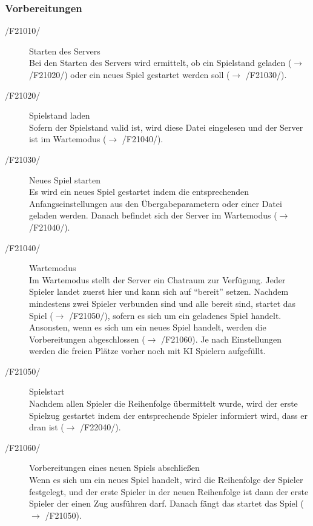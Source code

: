 \documentclass[a4paper,10pt]{article}
\begin{document}
\subsubsection{Vorbereitungen}
\begin{description}
\item[/F21010/] Starten des Servers \\
Bei den Starten des Servers wird ermittelt, ob ein Spielstand geladen ($\rightarrow$ /F21020/) oder ein neues Spiel gestartet werden soll ($\rightarrow$ /F21030/).
\item[/F21020/] Spielstand laden \\
Sofern der Spielstand valid ist, wird diese Datei eingelesen und der Server ist im Wartemodus ($\rightarrow$ /F21040/).
\item[/F21030/] Neues Spiel starten \\
Es wird ein neues Spiel gestartet indem die entsprechenden Anfangseinstellungen aus den Übergabeparametern oder einer Datei geladen werden. Danach befindet sich der Server im Wartemodus ($\rightarrow$ /F21040/).
\item[/F21040/] Wartemodus \\
Im Wartemodus stellt der Server ein Chatraum zur Verfügung. Jeder Spieler landet zuerst hier und kann sich auf "`bereit"' setzen. Nachdem mindestens zwei Spieler verbunden sind und alle bereit sind, startet das Spiel ($\rightarrow$ /F21050/), sofern es sich um ein geladenes Spiel handelt. Ansonsten, wenn es sich um ein neues Spiel handelt, werden die Vorbereitungen abgeschlossen ($\rightarrow$ /F21060). Je nach Einstellungen werden die freien Plätze vorher noch mit KI Spielern aufgefüllt.
\item[/F21050/] Spielstart \\
Nachdem allen Spieler die Reihenfolge übermittelt wurde, wird der erste Spielzug gestartet indem der entsprechende Spieler informiert wird, dass er dran ist ($\rightarrow$ /F22040/).
\item[/F21060/] Vorbereitungen eines neuen Spiels abschließen \\
Wenn es sich um ein neues Spiel handelt, wird die Reihenfolge der Spieler festgelegt, und der erste Spieler in der neuen Reihenfolge ist dann der erste Spieler der einen Zug ausführen darf. Danach fängt das startet das Spiel ($\rightarrow$ /F21050).
\end{description}
\end{document}
